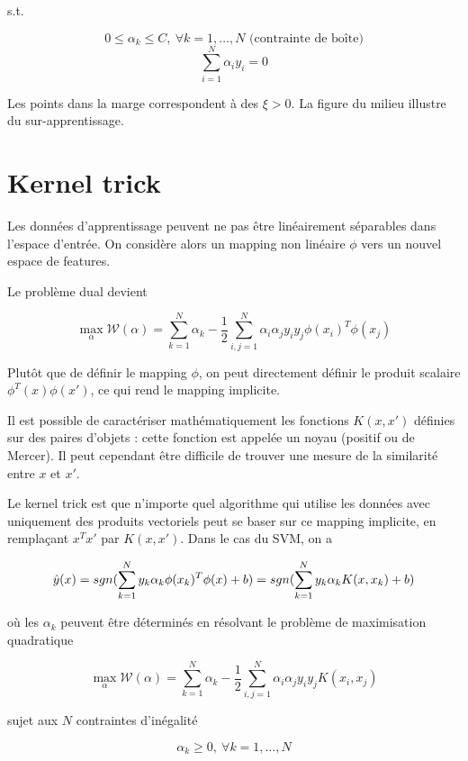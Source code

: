 	s.t.
	
	$$0 \leq \alpha_k \leq C, \: \forall k = 1, \dots , N \text{ (contrainte de boîte)}$$
	$$\sum_{i = 1}^N \alpha_i y_i = 0$$
	
	
	Les points dans la marge correspondent à des $\xi > 0$. La figure du milieu illustre du sur-apprentissage.
	
\section{Kernel trick}


Les données d'apprentissage peuvent ne pas être linéairement séparables dans l'espace d'entrée. On considère alors un mapping non linéaire $\phi$ vers un nouvel espace de features.


Le problème dual devient

$$\max_\alpha \mathcal{W}(\alpha) = \sum_{k = 1}^N \alpha_k - \frac{1}{2} \sum_{i, j = 1}^N \alpha_i \alpha_j y_i y_j \phi(x_i)^T \phi(x_j)$$

Plutôt que de définir le mapping $\phi$, on peut directement définir le produit scalaire $\phi^T(x) \phi(x')$, ce qui rend le mapping implicite.

Il est possible de caractériser mathématiquement les fonctions $K(x, x')$ définies sur des paires d'objets : cette fonction est appelée un noyau (positif ou de Mercer). Il peut cependant être difficile de trouver une mesure de la similarité entre $x$ et $x'$.

Le kernel trick est que n'importe quel algorithme qui utilise les données avec uniquement des produits vectoriels peut se baser sur ce mapping implicite, en remplaçant $x^Tx'$ par $K(x, x')$. Dans le cas du SVM, on a

$$\hat{y}(x) = sgn(\sum_{k = 1}^N y_k \alpha_k \phi(x_k)^T\phi(x) + b) = sgn(\sum_{k = 1}^N y_k \alpha_k K(x, x_k) + b)$$

où les $\alpha_k$ peuvent être déterminés en résolvant le problème de maximisation quadratique 

$$\max_\alpha \mathcal{W}(\alpha) = \sum_{k = 1}^N \alpha_k - \frac{1}{2} \sum_{i, j = 1}^N \alpha_i \alpha_j y_i y_j K(x_i, x_j)$$

sujet aux $N$ contraintes d'inégalité

$$\alpha_k \geq 0, \: \forall k = 1, \dots , N$$


